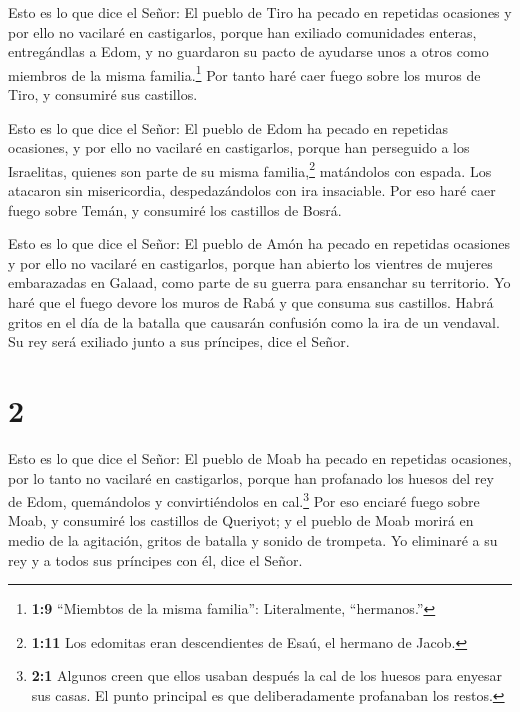  Esto es lo que dice el Señor: El pueblo de Tiro ha pecado
en repetidas ocasiones y por ello no vacilaré en castigarlos, porque han
exiliado comunidades enteras, entregándlas a Edom, y no guardaron su
pacto de ayudarse unos a otros como miembros de la misma
familia.\footnote{\textbf{1:9} ``Miembtos de la misma familia'':
  Literalmente, ``hermanos.''}  Por tanto haré caer fuego
sobre los muros de Tiro, y consumiré sus castillos.

 Esto es lo que dice el Señor: El pueblo de Edom ha pecado
en repetidas ocasiones, y por ello no vacilaré en castigarlos, porque
han perseguido a los Israelitas, quienes son parte de su misma
familia,\footnote{\textbf{1:11} Los edomitas eran descendientes de Esaú,
  el hermano de Jacob.} matándolos con espada. Los atacaron sin
misericordia, despedazándolos con ira insaciable.  Por eso
haré caer fuego sobre Temán, y consumiré los castillos de Bosrá.

 Esto es lo que dice el Señor: El pueblo de Amón ha pecado
en repetidas ocasiones y por ello no vacilaré en castigarlos, porque han
abierto los vientres de mujeres embarazadas en Galaad, como parte de su
guerra para ensanchar su territorio.  Yo haré que el fuego
devore los muros de Rabá y que consuma sus castillos. Habrá gritos en el
día de la batalla que causarán confusión como la ira de un vendaval.
 Su rey será exiliado junto a sus príncipes, dice el Señor.

\hypertarget{section-1}{%
\section{2}\label{section-1}}

 Esto es lo que dice el Señor: El pueblo de Moab ha pecado
en repetidas ocasiones, por lo tanto no vacilaré en castigarlos, porque
han profanado los huesos del rey de Edom, quemándolos y convirtiéndolos
en cal.\footnote{\textbf{2:1} Algunos creen que ellos usaban después la
  cal de los huesos para enyesar sus casas. El punto principal es que
  deliberadamente profanaban los restos.}  Por eso enciaré
fuego sobre Moab, y consumiré los castillos de Queriyot; y el pueblo de
Moab morirá en medio de la agitación, gritos de batalla y sonido de
trompeta.  Yo eliminaré a su rey y a todos sus príncipes con
él, dice el Señor.

